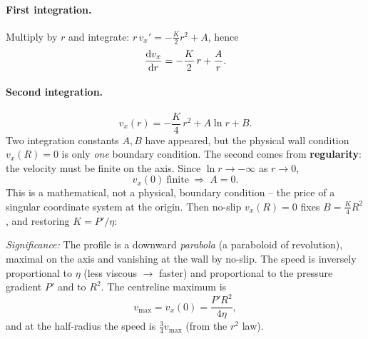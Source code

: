 \documentclass[../main.tex]{subfiles}
\begin{document}
\paragraph{First integration.} Multiply by $r$ and integrate: $r\,v_x'=-\tfrac{K}{2}r^2+A$, hence
\begin{equation}
  \dv{v_x}{r}=-\frac{K}{2}\,r+\frac{A}{r}.
  \label{eq:lec20_int1}
\end{equation}
\paragraph{Second integration.}
\begin{equation}
  v_x(r)=-\frac{K}{4}\,r^2+A\ln r+B .
  \label{eq:lec20_int2}
\end{equation}
Two integration constants $A,B$ have appeared, but the physical wall condition $v_x(R)=0$ is only \emph{one} boundary condition. The second comes from \textbf{regularity}: the velocity must be finite on the axis. Since $\ln r\to-\infty$ as $r\to0$,
\begin{equation}
  v_x(0)\ \text{finite}\;\Longrightarrow\; A=0 .
  \label{eq:lec20_regularity}
\end{equation}
This is a mathematical, not a physical, boundary condition -- the price of a singular coordinate system at the origin. Then no-slip $v_x(R)=0$ fixes $B=\tfrac{K}{4}R^2$, and restoring $K=P'/\eta$:

\textit{Significance:} The profile is a downward \emph{parabola} (a paraboloid of revolution), maximal on the axis and vanishing at the wall by no-slip. The speed is inversely proportional to $\eta$ (less viscous $\to$ faster) and proportional to the pressure gradient $P'$ and to $R^2$. The centreline maximum is
\begin{equation}
  v_{\max}=v_x(0)=\frac{P'R^2}{4\eta},
  \label{eq:lec20_vmax}
\end{equation}
and at the half-radius the speed is $\tfrac34 v_{\max}$ (from the $r^2$ law).
\end{document}
